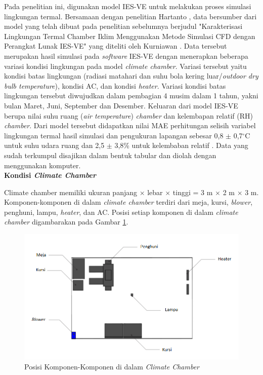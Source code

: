 Pada penelitian ini, digunakan model IES-VE untuk melakukan proses simulasi lingkungan termal. Bersamaan dengan penelitian Hartanto \cite{skripsiTanto}, data bersumber dari model yang telah dibuat pada penelitian sebelumnya berjudul "Karakterisasi Lingkungan Termal Chamber Iklim Menggunakan Metode Simulasi CFD dengan Perangkat Lunak IES-VE" yang diteliti oleh Kurniawan \cite{skripsiIchfan}.  Data tersebut merupakan hasil simulasi pada \textit{software} IES-VE dengan menerapkan beberapa variasi kondisi lingkungan pada model \textit{climate chamber}. Variasi tersebut yaitu kondisi batas lingkungan (radiasi matahari dan suhu bola kering luar/\textit{outdoor dry bulb temperature}), kondisi AC, dan kondisi \textit{heater}. Variasi kondisi batas lingkungan tersebut diwujudkan dalam pembagian 4 musim dalam 1 tahun, yakni bulan Maret, Juni, September dan Desember. Keluaran dari model IES-VE berupa nilai suhu ruang (\textit{air temperature}) \textit{chamber} dan kelembapan relatif (RH) \textit{chamber}. Dari model tersebut didapatkan nilai MAE perhitungan selisih variabel lingkungan termal hasil simulasi dan pengukuran lapangan sebesar 0,8 $\pm$ 0,7$^{\circ}$C untuk suhu udara ruang dan 2,5 $\pm$ 3,8\% untuk kelembaban relatif \cite{skripsiIchfan}. Data yang sudah terkumpul disajikan dalam bentuk tabular dan diolah dengan menggunakan komputer.\\

\noindent\textbf{Kondisi \textit{Climate Chamber}}

Climate chamber memiliki ukuran panjang $\times$ lebar $\times$ tinggi = 3 m $\times$ 2 m $\times$ 3 m. Komponen-komponen di dalam \textit{climate chamber} terdiri dari meja, kursi, \textit{blower}, penghuni, lampu, \textit{heater}, dan AC. Posisi setiap komponen di dalam \textit{climate chamber} digambarakan pada Gambar \ref{fig:4:KondisiChamber}.

\begin{figure}[!h]
	\centering
	\includegraphics[width=1\textwidth]{figures/KondisiChamber}
	\caption{Posisi Komponen-Komponen di dalam \textit{Climate Chamber}}
	\label{fig:4:KondisiChamber}
\end{figure}
\vspace{3em}

